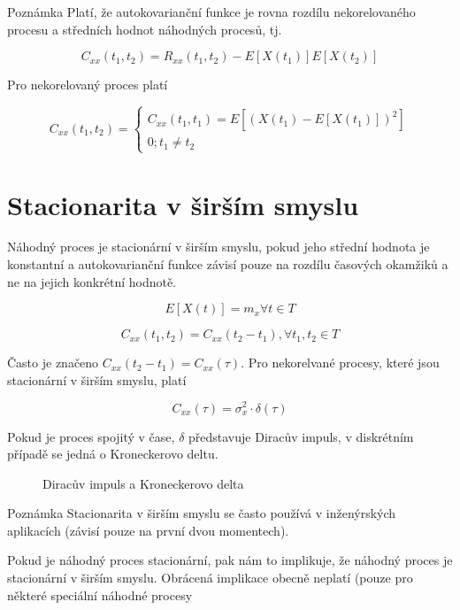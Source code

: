 \begin{note}{Poznámka}
Platí, že autokovarianční funkce je rovna rozdílu nekorelovaného procesu a středních hodnot náhodných procesů, tj.

\[ C_{xx}(t_1,t_2) = R_{xx}(t_1,t_2) - E[X(t_1)]E[X(t_2)] \]
\end{note}

Pro nekorelovaný proces platí

\[
C_{xx}(t_1,t_2) = 
\begin{cases}
	C_{xx}(t_1,t_1)=E[(X(t_1)-E[X(t_1)])^2]\\
	0; t_1\neq t_2
\end{cases}
\]

\section{Stacionarita v širším smyslu}
Náhodný proces je stacionární v širším smyslu, pokud jeho střední hodnota je konstantní a autokovarianční funkce závisí pouze na rozdílu časových okamžiků a ne na jejich konkrétní hodnotě.

\[ E[X(t)] = m_x\forall t\in T \]

\[ C_{xx}(t_1,t_2)=C_{xx}(t_2-t_1),\forall t_1,t_2\in T \]

Často je značeno $C_{xx}(t_2-t_1)=C_{xx}(\tau)$. Pro nekorelvané procesy, které jsou stacionární v širším smyslu, platí

\[ C_{xx}(\tau) = \sigma_x^2\cdot\delta(\tau) \]

Pokud je proces spojitý v čase, $\delta$ představuje Diracův impuls, v diskrétním případě se jedná o Kroneckerovo deltu.

\begin{figure}
\caption{Diracův impuls a Kroneckerovo delta}
\end{figure}

\begin{note}{Poznámka}
Stacionarita v širším smyslu se často používá v inženýrských aplikacích (závisí pouze na první dvou momentech).
\end{note}

Pokud je náhodný proces stacionární, pak nám to implikuje, že náhodný proces je stacionární v širším smyslu. Obrácená implikace obecně neplatí (pouze pro některé speciální náhodné procesy

